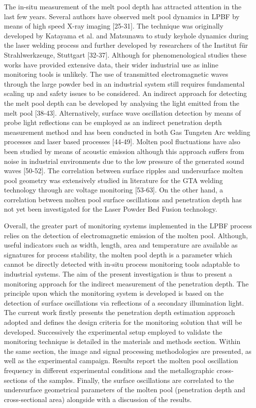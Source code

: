 \documentclass[10pt]{article}
\begin{document}
The in-situ measurement of the melt pool depth has attracted attention in the last few years. Several authors have observed melt pool dynamics in LPBF by means of high speed X-ray imaging [25-31]. The technique was originally developed by Katayama et al. and Matsunawa to study keyhole dynamics during the laser welding process and further developed by researchers of the Institut für Strahlwerkzeuge, Stuttgart [32-37]. Although for phenomenological studies these works have provided extensive data, their wider industrial use as inline monitoring tools is unlikely. The use of transmitted electromagnetic waves through the large powder bed in an industrial system still requires fundamental scaling up and safety issues to be considered. An indirect approach for detecting the melt pool depth can be developed by analysing the light emitted from the melt pool [38-43]. Alternatively, surface wave oscillation detection by means of probe light reflections can be employed as an indirect penetration depth measurement method and has been conducted in both Gas Tungsten Arc welding processes and laser based processes [44-49]. Molten pool fluctuations have also been studied by means of acoustic emission although this approach suffers from noise in industrial environments due to the low pressure of the generated sound waves [50-52]. The correlation between surface ripples and undersurface molten pool geometry was extensively studied in literature for the GTA welding technology through arc voltage monitoring [53-63]. On the other hand, a correlation between molten pool surface oscillations and penetration depth has not yet been investigated for the Laser Powder Bed Fusion technology.

Overall, the greater part of monitoring systems implemented in the LPBF process relies on the detection of electromagnetic emission of the molten pool. Although, useful indicators such as width, length, area and temperature are available as signatures for process stability, the molten pool depth is a parameter which cannot be directly detected with in-situ process monitoring tools adaptable to industrial systems. The aim of the present investigation is thus to present a monitoring approach for the indirect measurement of the penetration depth. The principle upon which the monitoring system is developed is based on the detection of surface oscillations via reflections of a secondary illumination light. The current work firstly presents the penetration depth estimation approach adopted and defines the design criteria for the monitoring solution that will be developed. Successively the experimental setup employed to validate the monitoring technique is detailed in the materials and methods section. Within the same section, the image and signal processing methodologies are presented, as well as the experimental campaign. Results report the molten pool oscillation frequency in different experimental conditions and the metallographic cross-sections of the samples. Finally, the surface oscillations are correlated to the undersurface geometrical parameters of the molten pool (penetration depth and cross-sectional area) alongside with a discussion of the results.
\end{document}
